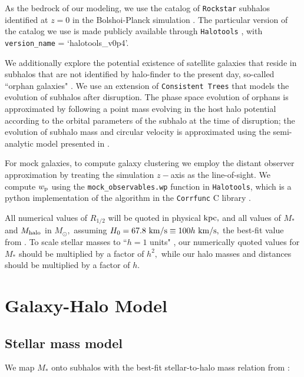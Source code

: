 \documentclass[usenatbib,usegraphicx,letterpaper]{mn2e}
\newcommand{\rhalf}{R_{1/2}}
\newcommand{\mstar}{M_{\ast}}
\newcommand{\mhalo}{M_{\rm halo}}
\newcommand{\wproj}{w_{\rm p}}
\newcommand{\kpc}{{\rm kpc}}
\newcommand{\msun}{M_\odot}
\newcommand{\kms}{{\rm km/s}}
\begin{document}
As the bedrock of our modeling, we use the catalog of {\tt Rockstar} subhalos identified at $z=0$ in the Bolshoi-Planck simulation \citep{klypin_etal11,behroozi12_rockstar,behroozi12_consistent_trees,riebe_etal13,rodriguez_puebla16_bolplanck}. The particular version of the catalog we use is made publicly available through {\tt Halotools} \citep{hearin_etal16}, with {\tt version\_name} = `halotools\_v0p4'.

We additionally explore the potential existence of satellite galaxies that reside in subhalos that are not identified by halo-finder to the present day, so-called ``orphan galaxies" \citep[see, e.g.,][]{campbell_etal17}. We use an extension of {\tt Consistent Trees} that models the evolution of subhalos after disruption. The phase space evolution of orphans is approximated by following a point mass evolving in the host halo potential according to the orbital parameters of the subhalo at the time of disruption; the evolution of subhalo mass and circular velocity is approximated using the semi-analytic model presented in \citet{jiang_vdB14}.

For mock galaxies, to compute galaxy clustering we employ the distant observer approximation by treating the simulation $z-$axis as the line-of-sight. We compute $\wproj$ using the {\tt mock\_observables.wp} function in {\tt Halotools}, which is a python implementation of the algorithm in the {\tt Corrfunc} C library \citep{sinha_etal17}.

All numerical values of $\rhalf$ will be quoted in physical $\kpc,$ and all values of $\mstar$ and $\mhalo$ in $\msun,$ assuming $H_0=67.8~\kms\equiv100h~\kms,$ the best-fit value from \citet{planck15}. To scale stellar masses to ``$h=1$ units" \citep{croton13}, our numerically quoted values for $\mstar$ should be multiplied by a factor of $h^2,$ while our halo masses and distances should be multiplied by a factor of $h.$


\section{Galaxy-Halo Model}
\label{sec:model}

\subsection{Stellar mass model}
\label{subsec:smhm}

We map $\mstar$ onto subhalos with the best-fit stellar-to-halo mass relation from \citet{moster_etal13}:
\end{document}
